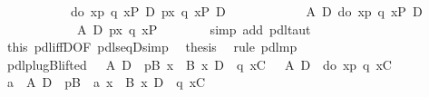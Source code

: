 \begin{isabellebody}
\ \ \isamarkupfalse%
\ {\isacharminus}\isanewline
\ \ \ \ \isamarkupfalse%
\ {\isachardoublequote}{\isasymturnstile}\ {\isacharparenleft}{\isasymlangle}do\ {\isacharbraceleft}x{\isasymleftarrow}p{\isacharsemicolon}\ q\ x{\isacharbraceright}{\isasymrangle}P\ {\isasymlongrightarrow}\isactrlsub D\ {\isasymlangle}p{\isasymrangle}{\isacharparenleft}{\isasymlambda}x{\isachardot}\ {\isasymlangle}q\ x{\isasymrangle}P{\isacharparenright}{\isacharparenright}\ {\isasymlongrightarrow}\isactrlsub D\isanewline
\ \ \ \ \ \ \ \ \ \ \ \ {\isacharparenleft}A\ {\isasymlongrightarrow}\isactrlsub D\ {\isasymlangle}do\ {\isacharbraceleft}x{\isasymleftarrow}p{\isacharsemicolon}\ q\ x{\isacharbraceright}{\isasymrangle}P{\isacharparenright}\ {\isasymlongrightarrow}\isactrlsub D\isanewline
\ \ \ \ \ \ \ \ \ \ \ \ {\isacharparenleft}A\ {\isasymlongrightarrow}\isactrlsub D\ {\isasymlangle}p{\isasymrangle}{\isacharparenleft}{\isasymlambda}x{\isachardot}\ {\isasymlangle}q\ x{\isasymrangle}P{\isacharparenright}{\isacharparenright}{\isachardoublequote}\isanewline
\ \ \ \ \ \ \isamarkupfalse%
\ {\isacharparenleft}simp\ add{\isacharcolon}\ pdl{\isacharunderscore}taut{\isacharparenright}\isanewline
\ \ \ \ \isamarkupfalse%
\ this\ pdl{\isacharunderscore}iffD{}{\isacharbrackleft}OF\ pdl{\isacharunderscore}seqD{\isacharunderscore}simp{\isacharbrackright}\ \isamarkupfalse%
\ {\isacharquery}thesis\ \isamarkupfalse%
\ {\isacharparenleft}rule\ pdl{\isacharunderscore}mp{\isacharparenright}\isanewline
\ \ \isamarkupfalse%
\isanewline
\isamarkupfalse%
\isanewline
\isanewline
\ \ \isanewline
\isanewline
\isamarkupfalse%
\ pdl{\isacharunderscore}plugB{\isacharunderscore}lifted{}{\isacharcolon}\ {\isachardoublequote}{\isasymlbrakk}\ {\isasymturnstile}\ A\ {\isasymlongrightarrow}\isactrlsub D\ {\isacharbrackleft}{\isacharhash}\ p{\isacharbrackright}B{\isacharsemicolon}\ {\isasymforall}x{\isachardot}\ {\isasymturnstile}\ B\ x\ {\isasymlongrightarrow}\isactrlsub D\ {\isacharbrackleft}{\isacharhash}\ q\ x{\isacharbrackright}C{\isasymrbrakk}\ {\isasymLongrightarrow}\ {\isasymturnstile}\ A\ {\isasymlongrightarrow}\isactrlsub D\ {\isacharbrackleft}{\isacharhash}\ do\ {\isacharbraceleft}x{\isasymleftarrow}p{\isacharsemicolon}\ q\ x{\isacharbraceright}{\isacharbrackright}C{\isachardoublequote}\isanewline
\isamarkupfalse%
\ {\isacharminus}\isanewline
\ \ \isamarkupfalse%
\ a{}{\isacharcolon}\ {\isachardoublequote}{\isasymturnstile}\ A\ {\isasymlongrightarrow}\isactrlsub D\ {\isacharbrackleft}{\isacharhash}\ p{\isacharbrackright}B{\isachardoublequote}\ \ a{}{\isacharcolon}\ {\isachardoublequote}{\isasymforall}x{\isachardot}\ {\isasymturnstile}\ B\ x\ {\isasymlongrightarrow}\isactrlsub D\ {\isacharbrackleft}{\isacharhash}\ q\ x{\isacharbrackright}C{\isachardoublequote}\isanewline

\end{isabellebody}
